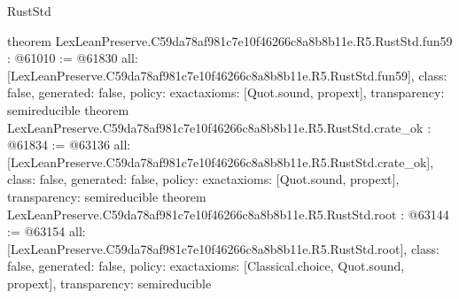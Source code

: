 \begin{lexlean}{RustStd}
\begin{coremodule}
{}
theorem LexLeanPreserve.C59da78af981c7e10f46266c8a8b8b11e.R5.RustStd.fun59 : @61010 := @61830 {
  all: [LexLeanPreserve.C59da78af981c7e10f46266c8a8b8b11e.R5.RustStd.fun59],
  class: false,
  generated: false,
  policy: exact{axioms: [Quot.sound, propext]},
  transparency: semireducible
}
theorem LexLeanPreserve.C59da78af981c7e10f46266c8a8b8b11e.R5.RustStd.crate_ok : @61834 := @63136 {
  all: [LexLeanPreserve.C59da78af981c7e10f46266c8a8b8b11e.R5.RustStd.crate_ok],
  class: false,
  generated: false,
  policy: exact{axioms: [Quot.sound, propext]},
  transparency: semireducible
}
theorem LexLeanPreserve.C59da78af981c7e10f46266c8a8b8b11e.R5.RustStd.root : @63144 := @63154 {
  all: [LexLeanPreserve.C59da78af981c7e10f46266c8a8b8b11e.R5.RustStd.root],
  class: false,
  generated: false,
  policy: exact{axioms: [Classical.choice, Quot.sound, propext]},
  transparency: semireducible
}


\end{coremodule}
\end{lexlean}
